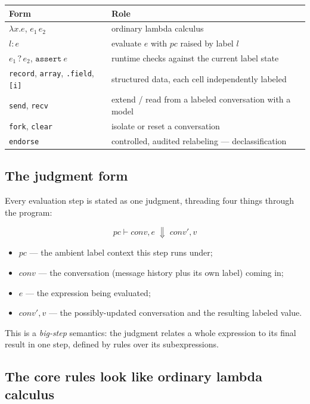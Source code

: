 \documentclass[11pt, a4paper]{article}
\newcommand{\bigstep}{\Downarrow}
\begin{document}
\begin{center}
\begin{tabular}{@{}ll@{}}
\toprule
Form & Role \\
\midrule
$\lambda x.e$, $e_1\,e_2$ & ordinary lambda calculus \\
$l : e$ & evaluate $e$ with $pc$ raised by label $l$ \\
$e_1 \mathbin{?} e_2$, $\mathtt{assert}\ e$ & runtime checks against the current label state \\
\texttt{record}, \texttt{array}, \texttt{.field}, \texttt{[i]} & structured data, each cell independently labeled \\
\texttt{send}, \texttt{recv} & extend / read from a labeled conversation with a model \\
\texttt{fork}, \texttt{clear} & isolate or reset a conversation \\
\texttt{endorse} & controlled, audited relabeling --- declassification \\
\bottomrule
\end{tabular}
\end{center}

\subsection{The judgment form}

Every evaluation step is stated as one judgment, threading four things
through the program:

\[
pc \vdash \mathit{conv}, e \;\bigstep\; \mathit{conv}', v
\]

\begin{itemize}
  \item $pc$ --- the ambient label context this step runs under;
  \item $\mathit{conv}$ --- the conversation (message history plus its own
    label) coming in;
  \item $e$ --- the expression being evaluated;
  \item $\mathit{conv}', v$ --- the possibly-updated conversation and the
    resulting labeled value.
\end{itemize}

This is a \emph{big-step} semantics: the judgment relates a whole
expression to its final result in one step, defined by rules over its
subexpressions.

\subsection{The core rules look like ordinary lambda calculus}
\end{document}
